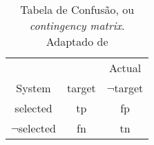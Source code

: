 \begin{table}[!h]
    \centering
    \begin{tabular}{c|c c}
                    &       &   Actual\\
        System      & target &  $\neg$target\\
        \hline
        selected    & tp & fp \\
        $\neg$selected   & fn & tn 
    \end{tabular}
    \caption[Tabela de Confusão]{Tabela de Confusão, ou \textit{contingency matrix}. Adaptado de \cite[p~268]{Manning1999FoundationsNLP} }
    \label{tab:tab_confusao}
\end{table}